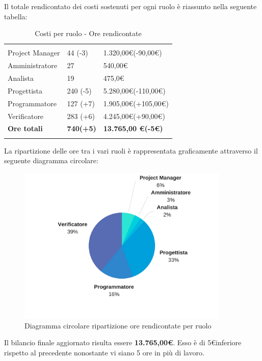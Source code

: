 Il totale rendicontato dei costi sostenuti per ogni ruolo è riassunto nella seguente tabella:
\begin{table}[H]
	\centering
	\begin{tabular}{|p{4cm}|C{4cm}|C{4cm}|}
		
		 & &\\
		Project Manager & 44 (-3) & 1.320,00\euro (-90,00\euro) \\
		\hline
		Amministratore& 27 & 540,00\euro \\
		\hline
		Analista & 19 & 475,0\euro \\
		\hline
		Progettista & 240 (-5) & 5.280,00\euro (-110,00\euro) \\
		\hline
		Programmatore & 127 (+7) & 1.905,00\euro (+105,00\euro) \\
		\hline
		Verificatore & 283 (+6) & 4.245,00\euro (+90,00\euro)\\
		\hline
		\textbf{Ore totali} & \textbf{740(+5)} & \textbf{13.765,00 \euro (-5\euro)} \\
	\end{tabular}
	\caption{Costi per ruolo - Ore rendicontate}
\end{table}

La ripartizione delle ore tra i vari ruoli è rappresentata graficamente attraverso il seguente diagramma circolare:

\begin{figure}[H] 
	\centering 
	\includegraphics[width=0.9\textwidth]{images/CircolareSoloRendicontateNuovo.png} 
	\caption{Diagramma circolare ripartizione ore rendicontate per ruolo}
	\label{CircolareSoloRendicontate}
\end{figure}

Il bilancio finale aggiornato risulta essere \textbf{13.765,00\euro}. Esso è di 5\euro inferiore rispetto al precedente nonostante vi siano 5 ore in più di lavoro.

